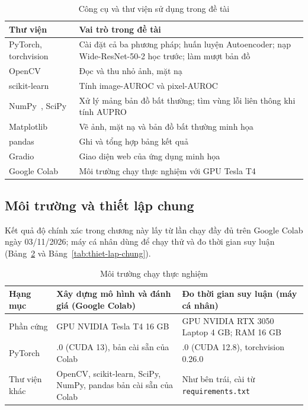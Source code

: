 \begin{table}[htbp]
  \centering
  \caption{Công cụ và thư viện sử dụng trong đề tài}
  \label{tab:tools}
  \small
  \begin{tabular}{@{}>{\raggedright\arraybackslash}p{3.2cm} >{\raggedright\arraybackslash}p{11.3cm}@{}}
    \toprule
    Thư viện & Vai trò trong đề tài \\
    \midrule
    PyTorch, torchvision~\cite{paszkePyTorchImperativeStyle2019} & Cài đặt cả ba phương pháp; huấn luyện Autoencoder; nạp
      Wide-ResNet-50-2 học trước; làm mượt bản đồ \\
    OpenCV & Đọc và thu nhỏ ảnh, mặt nạ \\
    scikit-learn~\cite{scikit-learnMachineLearning} & Tính image-AUROC và pixel-AUROC \\
    NumPy~\cite{numpyNumPy}, SciPy & Xử lý mảng bản đồ bất thường; tìm vùng lỗi liên thông khi tính AUPRO \\
    Matplotlib~\cite{matplotlibVisualizationPython} & Vẽ ảnh, mặt nạ và bản đồ bất thường minh họa \\
    pandas & Ghi và tổng hợp bảng kết quả \\
    Gradio & Giao diện web của ứng dụng minh họa \\
    Google Colab & Môi trường chạy thực nghiệm với GPU Tesla T4 \\
    \bottomrule
  \end{tabular}
\end{table}

\subsection{Môi trường và thiết lập chung}

Kết quả độ chính xác trong chương này lấy từ lần chạy đầy đủ trên Google Colab ngày 03/11/2026; máy cá nhân dùng để
chạy thử và đo thời gian suy luận (Bảng~\ref{tab:thiet-lap} và Bảng~\ref{tab:thiet-lap-chung}).

\begin{table}[htbp]
  \centering
  \caption{Môi trường chạy thực nghiệm}
  \label{tab:thiet-lap}
  \small
  \begin{tabular}{@{}>{\raggedright\arraybackslash}p{2.8cm} >{\raggedright\arraybackslash}p{6.2cm} >{\raggedright\arraybackslash}p{5.5cm}@{}}
    \toprule
    Hạng mục & Xây dựng mô hình và đánh giá (Google Colab) & Đo thời gian suy luận (máy cá nhân) \\
    \midrule
    Phần cứng & GPU NVIDIA Tesla T4 16 GB & GPU NVIDIA RTX 3050 Laptop 4 GB; RAM 16 GB \\
    PyTorch & 2.11.0 (CUDA 13), bản cài sẵn của Colab & 2.11.0 (CUDA 12.8), torchvision 0.26.0 \\
    Thư viện khác & OpenCV, scikit-learn, SciPy, NumPy, pandas bản cài sẵn của Colab & Như bên trái, cài từ
      \texttt{requirements.txt} \\
    \bottomrule
  \end{tabular}
\end{table}

